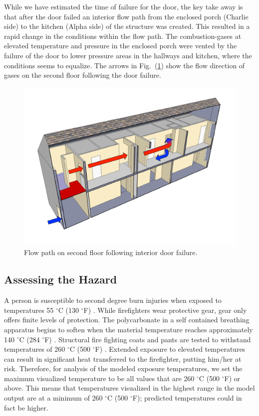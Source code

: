 \documentclass[11pt,oneside]{book}
\begin{document}
While we have estimated the time of failure for the door, the key take away is that after the door failed an interior flow path from the enclosed porch (Charlie side) to the kitchen (Alpha side) of the structure was created. This resulted in a rapid change in the conditions within the flow path. The combustion-gases at elevated temperature and pressure  in the enclosed porch were vented by the failure of the door to lower pressure areas in the hallways and kitchen, where the conditions seems to equalize. The arrows in Fig.~(\ref{fig:flowpath_1}) show the flow direction of gases on the second floor following the door failure.

\begin{figure}[h!]
\centering
\includegraphics[width=.7\textwidth]{../Figures/ChicagoFlow}
\caption{Flow path on second floor following interior door failure.}
\label{fig:flowpath_1}
\end{figure}

\subsection{Assessing the Hazard}

A person is susceptible to second degree burn injuries when exposed to temperatures 55 $^{\circ}$C (130 $^{\circ}$F) \cite{designation2003c}. While firefighters wear protective gear, gear only offers finite levels of protection. The polycarbonate in a self contained breathing apparatus begins to soften when the material temperature reaches approximately 140 $^{\circ}$C (284 $^{\circ}$F) \cite{mensch2011emergency}. Structural fire fighting coats and pants are tested to withstand temperatures of 260 $^{\circ}$C (500 $^{\circ}$F) \cite{nfpa2013standard}. Extended exposure to elevated temperatures can result in significant heat transferred to the firefighter, putting him/her at risk. Therefore, for analysis of the modeled exposure temperatures, we set the maximum visualized temperature to be all values that are 260 $^{\circ}$C (500 $^{\circ}$F) or above. This means that temperatures visualized in the highest range in the model output are at a minimum of 260 $^{\circ}$C (500 $^{\circ}$F); predicted temperatures could in fact be higher.
\end{document}

